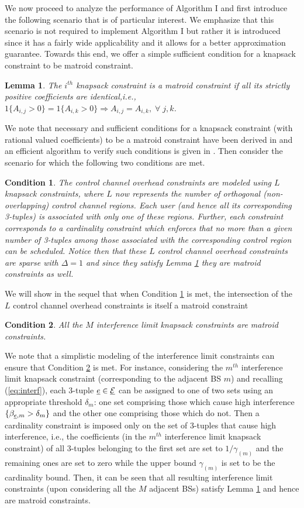 \documentclass[11pt] {article}
\newcommand{\Eulc} {{\underline{\mathcal E}}}
\newtheorem{lemma}{Lemma}
\newtheorem{condition}{Condition}
\begin{document}
We now proceed to analyze the performance of Algorithm I and first introduce the following scenario that is of particular interest. We emphasize that this scenario is not required to implement Algorithm I but rather it is introduced since it has a fairly wide applicability and it allows for  a better approximation guarantee. Towards this end, we offer a simple sufficient condition for a knapsack constraint to be matroid constraint.
  \begin{lemma}\label{assump:1}
  The $i^{th}$ knapsack constraint is a matroid constraint if all its strictly positive coefficients are identical,i.e., $1\{A_{i,j}>0\}=1\{A_{i,k}>0\}\Rightarrow A_{i,j}=A_{i,k},\;\forall\;j,k$.
  \end{lemma}
 We  note that
necessary and sufficient conditions for a knapsack constraint (with rational valued coefficients) to be a matroid constraint have been derived in \cite{wolsey:knap} and an efficient algorithm to verify such conditions is given in \cite{barcia:knap}.
Then consider the scenario for which the following two conditions are met.
 \begin{condition}\label{assump1}
   The control channel overhead  constraints are modeled using $L$ knapsack constraints,   where $L$  now represents the number of orthogonal (non-overlapping) control channel regions. Each  user (and hence all its corresponding 3-tuples) is associated with only one of these regions. Further, each constraint corresponds  to a  cardinality constraint   which enforces that no more than a given number of  3-tuples among those associated with the corresponding control region can be scheduled. Notice then that these $L$ control channel overhead constraints are sparse with $\Delta=1$ and since they satisfy Lemma \ref{assump:1} they are   matroid constraints as well. \end{condition}
   We will show in the sequel that when Condition \ref{assump1} is met, the intersection of the $L$ control channel overhead constraints is itself a matroid constraint
  \begin{condition}\label{assump2}
  All the $M$ interference limit knapsack constraints are matroid constraints.
  \end{condition}
  We note that a simplistic modeling of the interference limit constraints can ensure that Condition \ref{assump2} is met.
   For instance, considering the $m^{th}$ interference limit knapsack constraint (corresponding to the adjacent  BS $m$) and recalling (\ref{eq:interf}), each 3-tuple  $\eul\in\Eulc$ can be assigned to one of two sets using an appropriate threshold $\delta_m$: one set comprising those which cause high interference $\{\beta_{{\underline e},m}>\delta_m\}$ and the other one comprising those which do not. Then a cardinality constraint is imposed only on the set of 3-tuples that cause high interference, i.e., the coefficients (in the $m^{th}$ interference limit knapsack constraint) of all 3-tuples belonging to the first set are set to $1/\gamma_{(m)}$  and the remaining ones are set to zero while the upper bound $\gamma_{(m)}$ is set to be the cardinality bound. Then, it can be seen that all resulting interference limit constraints (upon considering all the $M$ adjacent BSs)  satisfy Lemma \ref{assump:1} and hence are   matroid constraints.
\end{document}
